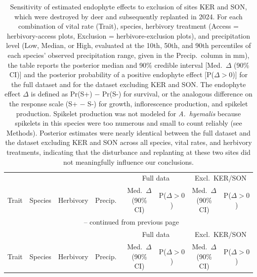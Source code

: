 \begin{landscape}
\small
\setlength{\tabcolsep}{1pt}
\begin{longtable}{llllcccc}
\caption{Sensitivity of estimated endophyte effects to exclusion of sites KER and SON, which were destroyed by deer and subsequently replanted in 2024. For each combination of vital rate (Trait), species, herbivory treatment (Access = herbivory-access plots, Exclusion = herbivore-exclusion plots), and precipitation level (Low, Median, or High, evaluated at the 10th, 50th, and 90th percentiles of each species' observed precipitation range, given in the Precip.\ column in mm), the table reports the posterior median and 90\% credible interval [Med.\ $\Delta$ (90\% CI)] and the posterior probability of a positive endophyte effect [P($\Delta>0$)] for the full dataset and for the dataset excluding KER and SON. The endophyte effect $\Delta$ is defined as Pr(S+) $-$ Pr(S-) for survival, or the analogous difference on the response scale (S+ $-$ S-) for growth, inflorescence production, and spikelet production. Spikelet production was not modeled for \textit{A.\ hyemalis} because spikelets in this species were too numerous and small to count reliably (see Methods). Posterior estimates were nearly identical between the full dataset and the dataset excluding KER and SON across all species, vital rates, and herbivory treatments, indicating that the disturbance and replanting at these two sites did not meaningfully influence our conclusions.} \label{tab:sensitivity_KER_SON} \\
\toprule
& & & & \multicolumn{2}{c}{Full data} & \multicolumn{2}{c}{Excl.\ KER/SON} \\
\cmidrule(lr){5-6} \cmidrule(lr){7-8}
Trait & Species & Herbivory & Precip.\ & Med.\ $\Delta$ (90\% CI) & P($\Delta{>}0$) & Med.\ $\Delta$ (90\% CI) & P($\Delta{>}0$) \\
\midrule
\endfirsthead

\multicolumn{8}{c}{{\tablename\ \thetable{} -- continued from previous page}} \\
\toprule
& & & & \multicolumn{2}{c}{Full data} & \multicolumn{2}{c}{Excl.\ KER/SON} \\
\cmidrule(lr){5-6} \cmidrule(lr){7-8}
Trait & Species & Herbivory & Precip.\ & Med.\ $\Delta$ (90\% CI) & P($\Delta{>}0$) & Med.\ $\Delta$ (90\% CI) & P($\Delta{>}0$) \\
\midrule
\endhead


\end{longtable}
\end{landscape}
